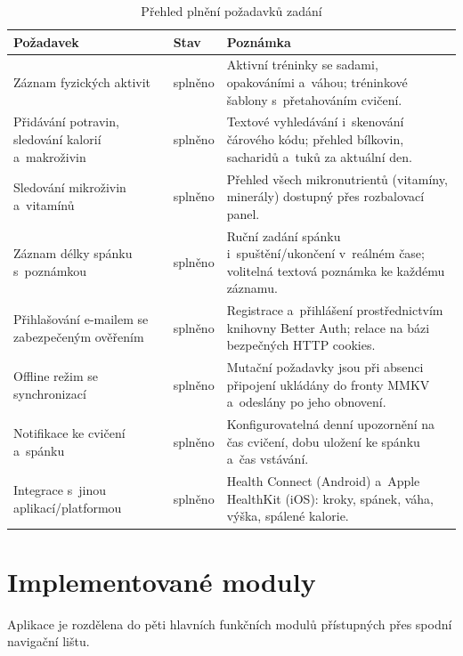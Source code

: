 \begin{table}[H]
  \centering
  \caption{Přehled plnění požadavků zadání}
  \label{tab:pozadavky}
  \begin{tabularx}{\textwidth}{|p{5.5cm}|p{1.8cm}|L|}
    \hline
    \textbf{Požadavek} & \textbf{Stav} & \textbf{Poznámka} \\
    \hline
    Záznam fyzických aktivit & splněno
      & Aktivní tréninky se sadami, opakováními a~váhou;
        tréninkové šablony s~přetahováním cvičení. \\
    \hline
    Přidávání potravin, sledování kalorií a~makroživin & splněno
      & Textové vyhledávání i~skenování čárového kódu;
        přehled bílkovin, sacharidů a~tuků za aktuální den. \\
    \hline
    Sledování mikroživin a~vitamínů & splněno
      & Přehled všech mikronutrientů (vitamíny, minerály)
        dostupný přes rozbalovací panel. \\
    \hline
    Záznam délky spánku s~poznámkou & splněno
      & Ruční zadání spánku i~spuštění/ukončení v~reálném čase;
        volitelná textová poznámka ke každému záznamu. \\
    \hline
    Přihlašování e-mailem se zabezpečeným ověřením & splněno
      & Registrace a~přihlášení prostřednictvím knihovny
        Better Auth; relace na bázi bezpečných HTTP cookies. \\
    \hline
    Offline režim se synchronizací & splněno
      & Mutační požadavky jsou při absenci připojení
        ukládány do fronty MMKV a~odeslány po jeho obnovení. \\
    \hline
    Notifikace ke cvičení a~spánku & splněno
      & Konfigurovatelná denní upozornění na čas cvičení,
        dobu uložení ke spánku a~čas vstávání. \\
    \hline
    Integrace s~jinou aplikací/platformou & splněno
      & Health Connect (Android) a~Apple HealthKit (iOS):
        kroky, spánek, váha, výška, spálené kalorie. \\
    \hline
  \end{tabularx}
\end{table}

\section{Implementované moduly}

Aplikace je rozdělena do pěti hlavních funkčních modulů přístupných
přes spodní navigační lištu.

